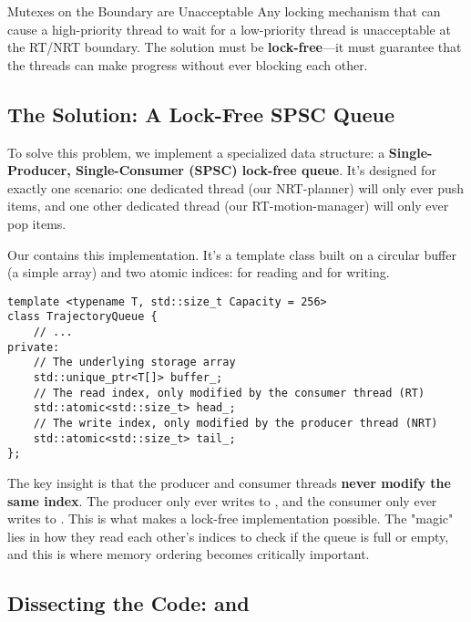 \begin{dangerbox}{Mutexes on the Boundary are Unacceptable}
Any locking mechanism that can cause a high-priority thread to wait for a low-priority thread is unacceptable at the RT/NRT boundary. The solution must be \textbf{lock-free}—it must guarantee that the threads can make progress without ever blocking each other.
\end{dangerbox}

\subsection{The Solution: A Lock-Free SPSC Queue}
\label{subsec:lock_free_spsc}

To solve this problem, we implement a specialized data structure: a \textbf{Single-Producer, Single-Consumer (SPSC) lock-free queue}. It's designed for exactly one scenario: one dedicated thread (our NRT-planner) will only ever push items, and one other dedicated thread (our RT-motion-manager) will only ever pop items.

Our  contains this implementation. It's a template class built on a circular buffer (a simple array) and two atomic indices:  for reading and  for writing.

\begin{verbatim}
template <typename T, std::size_t Capacity = 256>
class TrajectoryQueue {
    // ...
private:
    // The underlying storage array
    std::unique_ptr<T[]> buffer_;
    // The read index, only modified by the consumer thread (RT)
    std::atomic<std::size_t> head_;
    // The write index, only modified by the producer thread (NRT)
    std::atomic<std::size_t> tail_;
};
\end{verbatim}
\label{lst:spsc-fields}

The key insight is that the producer and consumer threads \textbf{never modify the same index}. The producer only ever writes to , and the consumer only ever writes to . This is what makes a lock-free implementation possible. The "magic" lies in how they read each other's indices to check if the queue is full or empty, and this is where memory ordering becomes critically important.

\subsection{Dissecting the Code:  and }
\label{subsec:dissecting_lock_free}

